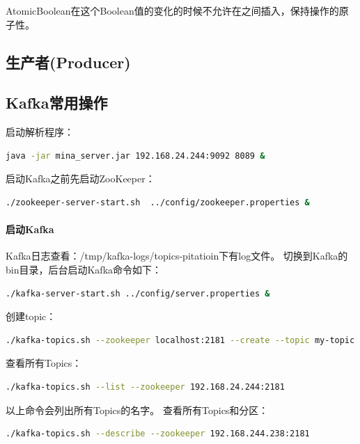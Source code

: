 \documentclass{book}
\begin{document}
AtomicBoolean在这个Boolean值的变化的时候不允许在之间插入，保持操作的原子性。

\subsection{生产者(Producer)}



\subsection{Kafka常用操作}

启动解析程序：

\begin{lstlisting}[language=Bash]
 java -jar mina_server.jar 192.168.24.244:9092 8089 &
\end{lstlisting}

启动Kafka之前先启动ZooKeeper：

\begin{lstlisting}[language=Bash]
./zookeeper-server-start.sh  ../config/zookeeper.properties &
\end{lstlisting}

\paragraph{启动Kafka}

Kafka日志查看：/tmp/kafka-logs/topics-pitatioin下有log文件。
切换到Kafka的bin目录，后台启动Kafka命令如下：

\begin{lstlisting}[language=Bash]
./kafka-server-start.sh ../config/server.properties &
\end{lstlisting}

创建topic：

\begin{lstlisting}[language=Bash]
./kafka-topics.sh --zookeeper localhost:2181 --create --topic my-topic --partitions 1 --replication-factor 2 --config max.message.bytes=64000 --config flush.messages=1
\end{lstlisting}

查看所有Topics：

\begin{lstlisting}[language=Bash]
./kafka-topics.sh --list --zookeeper 192.168.24.244:2181
\end{lstlisting}

以上命令会列出所有Topics的名字。
查看所有Topics和分区：

\begin{lstlisting}[language=Bash]
./kafka-topics.sh --describe --zookeeper 192.168.244.238:2181
\end{lstlisting}
\end{document}
